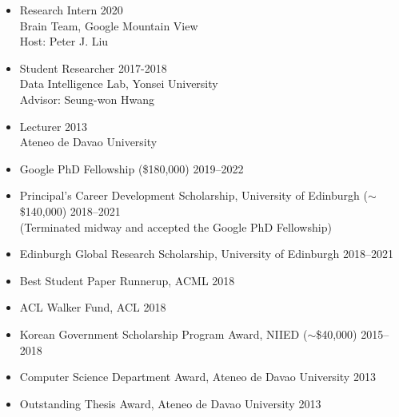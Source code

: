 \documentclass[11pt]{article}
\renewcommand{\section}[1]
{\vspace{1.0\baselineskip}{\Large\textbf{#1}}}
\begin{document}
\begin{itemize}[leftmargin=12pt]
  \item[] Research Intern \hfill 2020 \\
  Brain Team, Google Mountain View \\
  Host: Peter J. Liu
  
  \item[] Student Researcher \hfill 2017-2018 \\
  Data Intelligence Lab, Yonsei University \\
  Advisor: Seung-won Hwang
  
  \item[] Lecturer \hfill 2013 \\
  Ateneo de Davao University
\end{itemize}

\section{Awards}

\begin{itemize}[leftmargin=12pt]
  \item[] Google PhD Fellowship 
  {\small (\$180,000)}
  \hfill 2019--2022
  
  \item[] Principal’s Career Development Scholarship, University of Edinburgh 
  {\small ($\sim$\$140,000)}
  \hfill 2018--2021\\
  {\footnotesize (Terminated midway and accepted the Google PhD Fellowship)}
  
  \item[] Edinburgh Global Research Scholarship, University of Edinburgh \hfill 2018--2021
  
  \item[] Best Student Paper Runnerup, ACML \hfill 2018
  
  \item[] ACL Walker Fund, ACL \hfill 2018
  
  \item[] Korean Government Scholarship Program Award, NIIED 
  {\small ($\sim$\$40,000)} 
  \hfill 2015--2018
  
  \item[] Computer Science Department Award, Ateneo de Davao University \hfill 2013
  
  \item[] Outstanding Thesis Award, Ateneo de Davao University \hfill 2013
\end{itemize}
\end{document}
